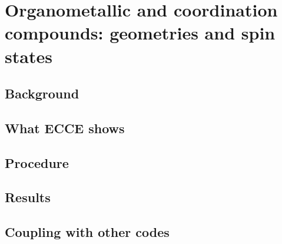 \chapter{Organometallic and coordination compounds: geometries and spin states}
\label{ch:organometallics}

\section{Background}

\section{What ECCE shows}

\section{Procedure}

\section{Results}

\section{Coupling with other codes}


